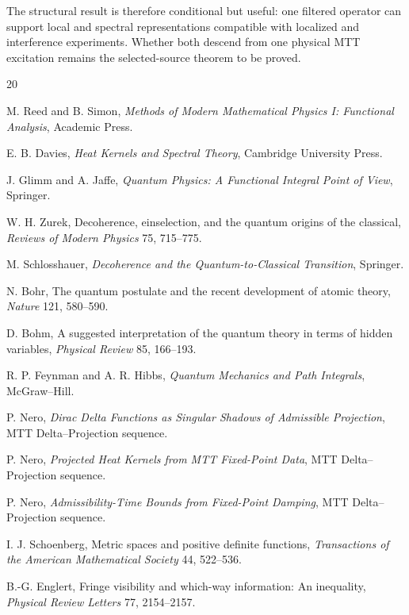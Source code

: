 \documentclass[11pt]{article}
\begin{document}
The structural result is therefore conditional but useful: one filtered operator can support
local and spectral representations compatible with localized and interference experiments.
Whether both descend from one physical MTT excitation remains the selected-source theorem
to be proved.

\begin{thebibliography}{20}

M. Reed and B. Simon,
\emph{Methods of Modern Mathematical Physics I: Functional Analysis},
Academic Press.

E. B. Davies,
\emph{Heat Kernels and Spectral Theory},
Cambridge University Press.

J. Glimm and A. Jaffe,
\emph{Quantum Physics: A Functional Integral Point of View},
Springer.

W. H. Zurek,
Decoherence, einselection, and the quantum origins of the classical,
\emph{Reviews of Modern Physics} 75, 715--775.

M. Schlosshauer,
\emph{Decoherence and the Quantum-to-Classical Transition},
Springer.

N. Bohr,
The quantum postulate and the recent development of atomic theory,
\emph{Nature} 121, 580--590.

D. Bohm,
A suggested interpretation of the quantum theory in terms of hidden variables,
\emph{Physical Review} 85, 166--193.

R. P. Feynman and A. R. Hibbs,
\emph{Quantum Mechanics and Path Integrals},
McGraw--Hill.

P. Nero,
\emph{Dirac Delta Functions as Singular Shadows of Admissible Projection},
MTT Delta--Projection sequence.

P. Nero,
\emph{Projected Heat Kernels from MTT Fixed-Point Data},
MTT Delta--Projection sequence.

P. Nero,
\emph{Admissibility-Time Bounds from Fixed-Point Damping},
MTT Delta--Projection sequence.


I. J. Schoenberg,
Metric spaces and positive definite functions,
\emph{Transactions of the American Mathematical Society} 44, 522--536.

B.-G. Englert,
Fringe visibility and which-way information: An inequality,
\emph{Physical Review Letters} 77, 2154--2157.


\end{thebibliography}
\end{document}

